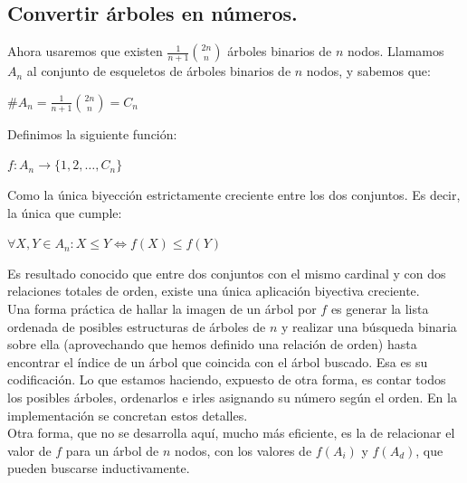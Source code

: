 \documentclass{article}
\begin{document}
\subsection {Convertir árboles en números.}

Ahora usaremos que existen $\frac{1}{n+1} {2n \choose n}$ árboles binarios de $n$ nodos. Llamamos $A_n$ al conjunto de esqueletos de árboles binarios
de $n$ nodos, y sabemos que:
\begin{adjustwidth}{2cm}{}
$\#A_n = \frac{1}{n+1} {2n \choose n} = C_n$ \\
\end{adjustwidth}

Definimos la siguiente función:
\begin{adjustwidth}{2cm}{}
 $f : A_n \longrightarrow \{1,2,\dots,C_n\}$ 
\end{adjustwidth}
Como la única biyección estrictamente creciente entre los dos conjuntos. Es decir, la única que cumple:
\begin{adjustwidth}{2cm}{}
 $\displaystyle \forall X,Y \in A_n : X \leq Y \Longleftrightarrow f(X) \leq f(Y)$
\end{adjustwidth}
Es resultado conocido que entre dos conjuntos con el mismo cardinal y con dos relaciones totales de orden,
existe una única aplicación biyectiva creciente. \\

Una forma práctica de hallar la imagen de un árbol por $f$ es generar la lista ordenada de posibles estructuras de árboles de $n$ y
realizar una búsqueda binaria sobre ella (aprovechando que hemos definido una relación de orden) hasta encontrar el índice
de un árbol que coincida con el árbol buscado. Esa es su codificación. 
 Lo que estamos haciendo, expuesto de otra forma, es contar todos los posibles árboles, ordenarlos e irles asignando su número según el orden.
 En la implementación se concretan estos detalles.\\

Otra forma, que no se desarrolla aquí, mucho más
eficiente, es la de relacionar el valor de $f$ para un árbol de $n$ nodos, con los valores de $f(A_i)$ y $f(A_d)$, que pueden buscarse inductivamente.
\end{document}

